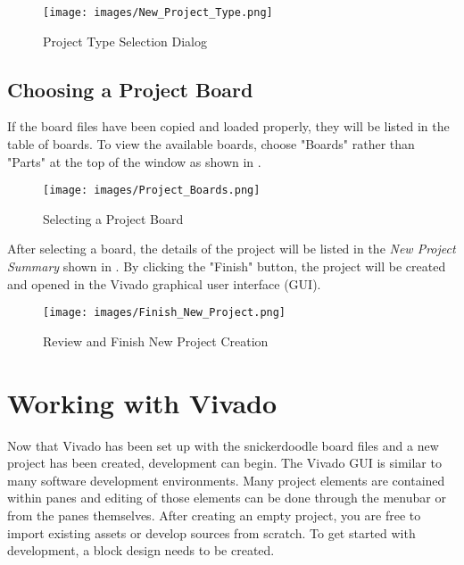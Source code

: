 \begin{figure}
	\centering
	\texttt{[image: images/New\_Project\_Type.png]}
	\caption{Project Type Selection Dialog}
	\label{fig:newprojecttype}
\end{figure}


\newpage

\subsection{Choosing a Project Board}
If the board files have been copied and loaded properly, they will be listed in the table of boards. To view the available boards, choose "Boards" rather than "Parts" at the top of the window as shown in . \\

\begin{figure}
	\centering
	\texttt{[image: images/Project\_Boards.png]}
	\caption{Selecting a Project Board}
	\label{fig:vivadoprojectboard}
\end{figure}

\noindent
After selecting a board, the details of the project will be listed in the \textit{New Project Summary} shown in . By clicking the "Finish" button, the project will be created and opened in the Vivado graphical user interface (GUI). \\

\begin{figure}
	\centering
	\texttt{[image: images/Finish\_New\_Project.png]}
	\caption{Review and Finish New Project Creation}
	\label{fig:vivadoprojectfinish}
\end{figure}


\section{Working with Vivado}

Now that Vivado has been set up with the snickerdoodle board files and a new project has been created, development can begin. The Vivado GUI is similar to many software development environments. Many project elements are contained within panes and editing of those elements can be done through the menubar or from the panes themselves. After creating an empty project, you are free to import existing assets or develop sources from scratch. To get started with development, a block design needs to be created.


